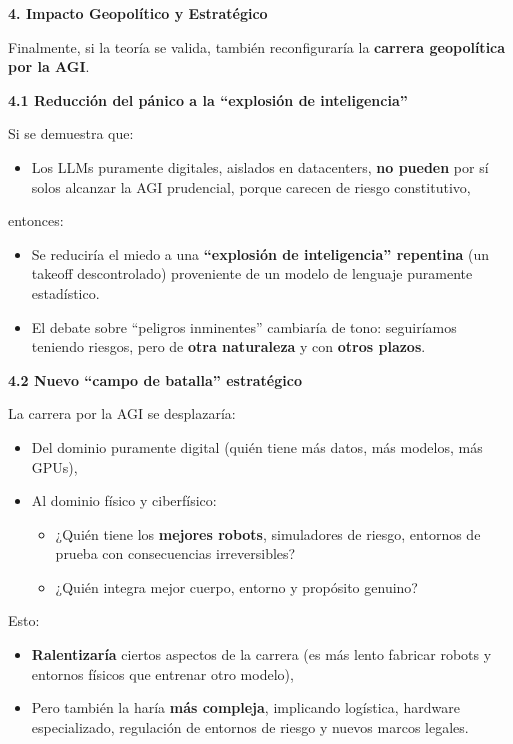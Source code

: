 \textbf{4. Impacto Geopolítico y Estratégico}

Finalmente, si la teoría se valida, también reconfiguraría la
\textbf{carrera geopolítica por la AGI}.

\textbf{4.1 Reducción del pánico a la ``explosión de inteligencia''}

Si se demuestra que:

\begin{itemize}
\item
  Los LLMs puramente digitales, aislados en datacenters, \textbf{no
  pueden} por sí solos alcanzar la AGI prudencial, porque carecen de
  riesgo constitutivo,
\end{itemize}

entonces:

\begin{itemize}
\item
  Se reduciría el miedo a una \textbf{``explosión de inteligencia''
  repentina} (un takeoff descontrolado) proveniente de un modelo de
  lenguaje puramente estadístico.
\item
  El debate sobre ``peligros inminentes'' cambiaría de tono: seguiríamos
  teniendo riesgos, pero de \textbf{otra naturaleza} y con \textbf{otros
  plazos}.
\end{itemize}

\textbf{4.2 Nuevo ``campo de batalla'' estratégico}

La carrera por la AGI se desplazaría:

\begin{itemize}
\item
  Del dominio puramente digital (quién tiene más datos, más modelos, más
  GPUs),
\item
  Al dominio físico y ciberfísico:

  \begin{itemize}
  \item
    ¿Quién tiene los \textbf{mejores robots}, simuladores de riesgo,
    entornos de prueba con consecuencias irreversibles?
  \item
    ¿Quién integra mejor cuerpo, entorno y propósito genuino?
  \end{itemize}
\end{itemize}

Esto:

\begin{itemize}
\item
  \textbf{Ralentizaría} ciertos aspectos de la carrera (es más lento
  fabricar robots y entornos físicos que entrenar otro modelo),
\item
  Pero también la haría \textbf{más compleja}, implicando logística,
  hardware especializado, regulación de entornos de riesgo y nuevos
  marcos legales.
\end{itemize}

